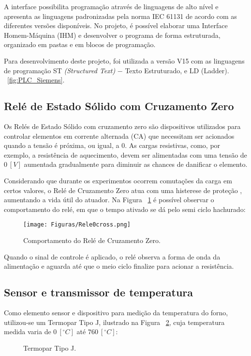         A interface possibilita programação através de linguagens de alto nível e apresenta as linguagens padronizadas pela norma IEC 61131 de acordo com as diferentes versões disponíveis. No projeto, é possível elaborar uma Interface Homem-Máquina (IHM) e desenvolver o programa de forma estruturada, organizado em pastas e em blocos de programação.
        
        Para desenvolvimento deste projeto, foi utilizada a versão V15 com as linguagens de programação ST \textit{(Structured Text)} $-$ Texto Estruturado, e LD (Ladder).  ~\ref{fig:PLC_Siemens}.
    \subsection{Relé de Estado Sólido com Cruzamento Zero}
        Os Relés de Estado Sólido com cruzamento zero são dispositivos utilizados para controlar elementos em corrente alternada (CA) que necessitam ser acionados quando a tensão é próxima, ou igual, a $0$. As cargas resistivas, como, por exemplo, a resistência de aquecimento, devem ser alimentadas com uma tensão de $0 \ [V]$ aumentada gradualmente para diminuir as chances de danificar o elemento.
        
        Considerando que durante os experimentos ocorrem comutações da carga em certos valores, o Relé de Cruzamento Zero atua com uma histerese de proteção \cite{Rele_EstadoSolido}, aumentando a vida útil do atuador. Na Figura ~\ref{fig:rele0cross} é possível observar o comportamento do relé, em que o tempo ativado se dá pelo semi ciclo hachurado:
        \begin{figure}[H]
            \centering
            \texttt{[image: Figuras/Rele0cross.png]}
            \caption{Comportamento do Relé de Cruzamento Zero.} \label{fig:rele0cross}
        \end{figure}
        Quando o sinal de controle é aplicado, o relé observa a forma de onda da alimentação e aguarda até que o meio ciclo finalize para acionar a resistência.
    \subsection{Sensor e transmissor de temperatura}
        Como elemento sensor e dispositivo para medição da temperatura do forno, utilizou-se um Termopar Tipo J, ilustrado na Figura ~\ref{fig:TermoparJ}, cuja temperatura medida varia de $0 \ [^{\circ}C]$ até $760 \ [^{\circ}C]$:
        \begin{figure}[H]
            \centering
                \caption{Termopar Tipo J.} \label{fig:TermoparJ}
        \end{figure}
        
